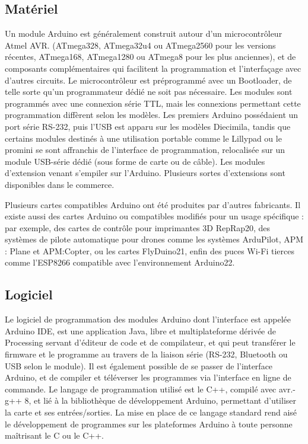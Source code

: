 \subsection{Matériel}
Un module Arduino est généralement construit autour d’un microcontrôleur Atmel 
AVR. (ATmega328, ATmega32u4 ou ATmega2560 pour les versions récentes, ATmega168, 
ATmega1280 ou ATmega8 pour les plus anciennes), et de composants complémentaires 
qui facilitent la programmation et l’interfaçage avec d’autres circuits. 
Le microcontrôleur est préprogrammé avec un Bootloader, de telle sorte qu’un 
programmateur dédié ne soit pas nécessaire. Les modules sont programmés avec 
une connexion série TTL, mais les connexions permettant cette programmation 
diffèrent selon les modèles. Les premiers Arduino possédaient un port série 
RS-232, puis l’USB est apparu sur les modèles Diecimila, tandis que certains 
modules destinés à une utilisation portable comme le Lillypad ou le promini se 
sont affranchis de l’interface de programmation, relocalisée sur un module 
USB-série dédié (sous forme de carte ou de câble). Les modules d’extension 
venant s’empiler sur l’Arduino. Plusieurs sortes d’extensions sont disponibles 
dans le commerce.

Plusieurs cartes compatibles Arduino ont été produites par d’autres fabricants. 
Il existe aussi des cartes Arduino ou compatibles modifiés pour un usage 
spécifique : par exemple, des cartes de contrôle pour imprimantes 3D RepRap20, 
des systèmes de pilote automatique pour drones comme les systèmes ArduPilot, 
APM : Plane et APM:Copter, ou les cartes FlyDuino21, enfin des puces Wi-Fi 
tierces comme l’ESP8266 compatible avec l’environnement Arduino22.\cite{30}

\subsection{Logiciel}
Le logiciel de programmation des modules Arduino dont l’interface est appelée 
Arduino IDE, est une application Java, libre et multiplateforme dérivée de 
Processing servant d’éditeur de code et de compilateur, et qui peut transférer 
le firmware et le programme au travers de la liaison série (RS-232, Bluetooth 
ou USB selon le module). Il est également possible de se passer de l’interface 
Arduino, et de compiler et téléverser les programmes via l’interface en ligne 
de commande. Le langage de programmation utilisé est le C++, compilé avec 
avr.-g++ 8, et lié à la bibliothèque de développement Arduino, permettant 
d’utiliser la carte et ses entrées/sorties. La mise en place de ce langage 
standard rend aisé le développement de programmes sur les plateformes Arduino à 
toute personne maîtrisant le C ou le C++.\cite{31}



